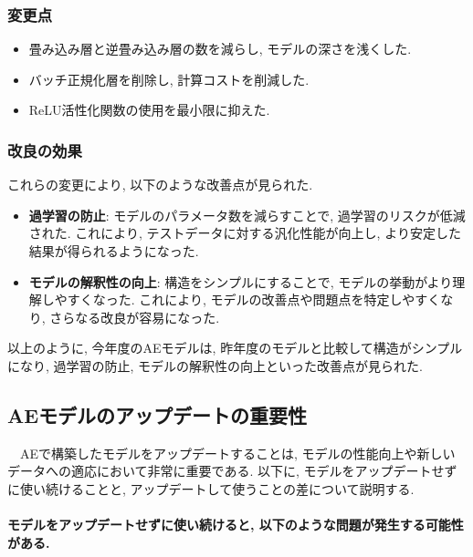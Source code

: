 \documentclass[a4paper, 12pt]{report}
\begin{document}
\subsubsection{変更点}

\begin{itemize}
    \item 畳み込み層と逆畳み込み層の数を減らし, モデルの深さを浅くした. 
    \item バッチ正規化層を削除し, 計算コストを削減した. 
    \item ReLU活性化関数の使用を最小限に抑えた. 
\end{itemize}

\subsubsection{改良の効果}
これらの変更により, 以下のような改善点が見られた. 
\begin{itemize}
    \item \textbf{過学習の防止}: モデルのパラメータ数を減らすことで, 過学習のリスクが低減された. これにより, テストデータに対する汎化性能が向上し, より安定した結果が得られるようになった. 
    \item \textbf{モデルの解釈性の向上}: 構造をシンプルにすることで, モデルの挙動がより理解しやすくなった. これにより, モデルの改善点や問題点を特定しやすくなり, さらなる改良が容易になった. 
\end{itemize}
以上のように, 今年度のAEモデルは, 昨年度のモデルと比較して構造がシンプルになり, 
過学習の防止, モデルの解釈性の向上といった改善点が見られた. 

\subsection{AEモデルのアップデートの重要性}
　AEで構築したモデルをアップデートすることは, モデルの性能向上や新しいデータへの適応において非常に重要である. 以下に, モデルをアップデートせずに使い続けることと, アップデートして使うことの差について説明する. 

\paragraph{モデルをアップデートせずに使い続けると, 以下のような問題が発生する可能性がある. }
\end{document}
